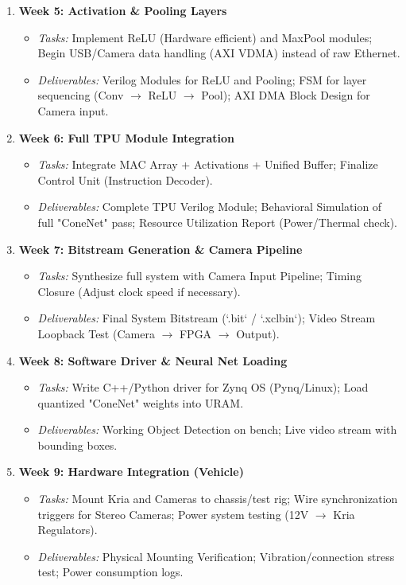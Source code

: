 \documentclass[11pt,a4paper,twoside]{article}
\begin{document}
\begin{enumerate}
    \item \textbf{Week 5: Activation \& Pooling Layers}
    \begin{itemize}
        \item \textit{Tasks:} Implement ReLU (Hardware efficient) and MaxPool modules; Begin USB/Camera data handling (AXI VDMA) instead of raw Ethernet.
        \item \textit{Deliverables:} Verilog Modules for ReLU and Pooling; FSM for layer sequencing (Conv $\rightarrow$ ReLU $\rightarrow$ Pool); AXI DMA Block Design for Camera input.
    \end{itemize}

    \item \textbf{Week 6: Full TPU Module Integration}
    \begin{itemize}
        \item \textit{Tasks:} Integrate MAC Array + Activations + Unified Buffer; Finalize Control Unit (Instruction Decoder).
        \item \textit{Deliverables:} Complete TPU Verilog Module; Behavioral Simulation of full "ConeNet" pass; Resource Utilization Report (Power/Thermal check).
    \end{itemize}

    \item \textbf{Week 7: Bitstream Generation \& Camera Pipeline}
    \begin{itemize}
        \item \textit{Tasks:} Synthesize full system with Camera Input Pipeline; Timing Closure (Adjust clock speed if necessary).
        \item \textit{Deliverables:} Final System Bitstream (`.bit` / `.xclbin`); Video Stream Loopback Test (Camera $\rightarrow$ FPGA $\rightarrow$ Output).
    \end{itemize}

    \item \textbf{Week 8: Software Driver \& Neural Net Loading}
    \begin{itemize}
        \item \textit{Tasks:} Write C++/Python driver for Zynq OS (Pynq/Linux); Load quantized "ConeNet" weights into URAM.
        \item \textit{Deliverables:} Working Object Detection on bench; Live video stream with bounding boxes.
    \end{itemize}

    \item \textbf{Week 9: Hardware Integration (Vehicle)}
    \begin{itemize}
        \item \textit{Tasks:} Mount Kria and Cameras to chassis/test rig; Wire synchronization triggers for Stereo Cameras; Power system testing (12V $\rightarrow$ Kria Regulators).
        \item \textit{Deliverables:} Physical Mounting Verification; Vibration/connection stress test; Power consumption logs.
    \end{itemize}


\end{enumerate}
\end{document}
